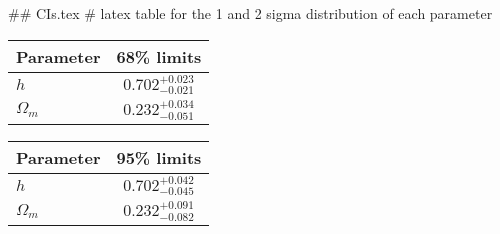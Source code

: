 ## CIs.tex
# latex table for the 1 and 2 sigma distribution of each parameter

\begin{tabular} { l  c}
 Parameter &  68\% limits\\
\hline
{\boldmath$h              $} & $0.702^{+0.023}_{-0.021}   $\\
{\boldmath$\Omega_m       $} & $0.232^{+0.034}_{-0.051}   $\\
\hline
\end{tabular}

\begin{tabular} { l  c}
 Parameter &  95\% limits\\
\hline
{\boldmath$h              $} & $0.702^{+0.042}_{-0.045}   $\\
{\boldmath$\Omega_m       $} & $0.232^{+0.091}_{-0.082}   $\\
\hline
\end{tabular}
